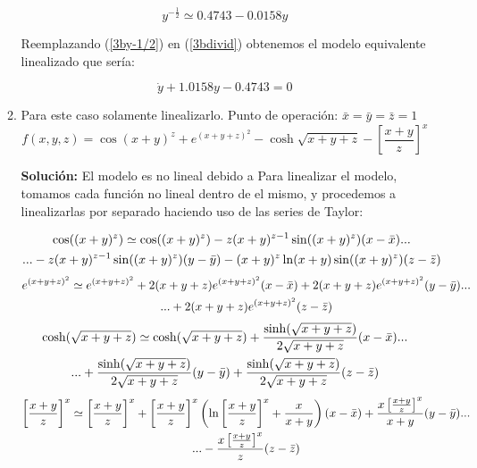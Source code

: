 \documentclass[letterpaper, 12pt]{article}
\begin{document}
\begin{enumerate}
\begin{enumerate}
\begin{equation}
    y^{-\frac{1}{2}}\simeq 0.4743-0.0158y
    \label{3by-1/2}
\end{equation}

Reemplazando (\ref{3by-1/2}) en (\ref{3bdivid}) obtenemos el modelo equivalente linealizado que sería:


\begin{equation}
    \dot{y}+1.0158y-0.4743=0
\end{equation}

\item Para este caso solamente linealizarlo. Punto de operación: $ \bar{x} = \bar{y} = \bar{z} = 1$
\begin{equation}
    f(x,y,z)=\cos(x+y)^z+e^{(x+y+z)^2}-\cosh{\sqrt{x+y+z}-\left[\frac{x+y}{z}\right]^x}
\end{equation}

\textbf{Solución:}
El modelo es no lineal debido a
Para linealizar el modelo, tomamos cada función no lineal dentro de el mismo, y procedemos a linealizarlas por separado haciendo uso de las series de Taylor:

\begin{multline}
    \notag
    \cos((x+y)^z)\simeq \cos((x+y)^z)-z(x+y)^{z-1} \sin((x+y)^z)(x-\bar{x}) ...
    \\...-z(x+y)^{z-1} \sin((x+y)^z)(y-\bar{y})
    -(x+y)^z \ln(x+y) \sin((x+y)^z)(z-\bar{z})
\end{multline}
\begin{multline}
    \notag
    e^{(x+y+z)^2}\simeq e^{(x+y+z)^2}+2(x+y+z)e^{(x+y+z)^2}(x-\bar{x})+2(x+y+z)e^{(x+y+z)^2}(y-\bar{y})...
    \\...+2(x+y+z)e^{(x+y+z)^2}(z-\bar{z})
\end{multline}
\begin{multline}
    \notag
    \cosh(\sqrt{x+y+z})\simeq \cosh(\sqrt{x+y+z})+\frac{\sinh(\sqrt{x+y+z})}{2\sqrt{x+y+z}}(x-\bar{x})...
    \\...+\frac{\sinh(\sqrt{x+y+z})}{2\sqrt{x+y+z}}(y-\bar{y})+\frac{\sinh(\sqrt{x+y+z})}{2\sqrt{x+y+z}}(z-\bar{z})
\end{multline}
\begin{multline}
    \notag
    \left[\frac{x+y}{z}\right]^x\simeq \left[\frac{x+y}{z}\right]^x +\left[\frac{x+y}{z}\right]^x \left(\ln\left[\frac{x+y}{z}\right]^x+\frac{x}{x+y}\right)(x-\bar{x})+\frac{x\left[\frac{x+y}{z}\right]^x}{x+y}(y-\bar{y})...
    \\ ...-\frac{x\left[\frac{x+y}{z}\right]^x}{z}(z-\bar{z})
\end{multline}


\end{enumerate}
\end{enumerate}
\end{document}
